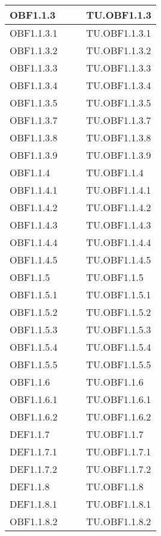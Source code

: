 \documentclass{scalatekids-article}
\begin{document}
\begin{longtable}[H]{|l|p{4cm}|p{4cm}|p{4cm}|}
  \hline
  OBF1.1.3 &  & & TU.OBF1.1.3 \\
  \hline
  OBF1.1.3.1 &  & & TU.OBF1.1.3.1 \\
  \hline
  OBF1.1.3.2 &  & & TU.OBF1.1.3.2 \\
  \hline
  OBF1.1.3.3 &  & & TU.OBF1.1.3.3 \\
  \hline
  OBF1.1.3.4 &  & & TU.OBF1.1.3.4 \\
  \hline
  OBF1.1.3.5 &  & & TU.OBF1.1.3.5 \\
  \hline
  OBF1.1.3.7 &  & & TU.OBF1.1.3.7 \\
  \hline
  OBF1.1.3.8 &  & & TU.OBF1.1.3.8 \\
  \hline
  OBF1.1.3.9 &  & & TU.OBF1.1.3.9 \\
  \hline
  OBF1.1.4 &  & & TU.OBF1.1.4 \\
  \hline
  OBF1.1.4.1 &  & & TU.OBF1.1.4.1 \\
  \hline
  OBF1.1.4.2 &  & & TU.OBF1.1.4.2 \\
  \hline
  OBF1.1.4.3 &  & & TU.OBF1.1.4.3 \\
  \hline
  OBF1.1.4.4 &  & & TU.OBF1.1.4.4 \\
  \hline
  OBF1.1.4.5 &  & & TU.OBF1.1.4.5 \\
  \hline
  OBF1.1.5 &  & & TU.OBF1.1.5 \\
  \hline
  OBF1.1.5.1 &  & & TU.OBF1.1.5.1 \\
  \hline
  OBF1.1.5.2 &  & & TU.OBF1.1.5.2 \\
  \hline
  OBF1.1.5.3 &  & & TU.OBF1.1.5.3 \\
  \hline
  OBF1.1.5.4 &  & & TU.OBF1.1.5.4 \\
  \hline
  OBF1.1.5.5 &  & & TU.OBF1.1.5.5 \\
  \hline
  OBF1.1.6 & & & TU.OBF1.1.6 \\
  \hline
  OBF1.1.6.1 &  & & TU.OBF1.1.6.1 \\
  \hline
  OBF1.1.6.2 &  & & TU.OBF1.1.6.2 \\
  \hline
  DEF1.1.7 & & & TU.OBF1.1.7 \\
  \hline
  DEF1.1.7.1 & & & TU.OBF1.1.7.1 \\
  \hline
  DEF1.1.7.2 & & & TU.OBF1.1.7.2 \\
  \hline
  DEF1.1.8 & & & TU.OBF1.1.8 \\
  \hline
  DEF1.1.8.1 & & & TU.OBF1.1.8.1 \\
  \hline
  OBF1.1.8.2 &  & & TU.OBF1.1.8.2 \\

\end{longtable}
\end{document}
